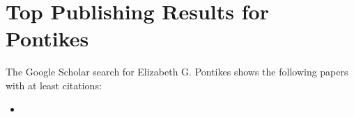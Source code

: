 \section{Top Publishing Results for Pontikes}

The Google Scholar search for Elizabeth G. Pontikes shows the following papers with at least  citations:\\

\begin{itemize}
\item 
\end{itemize}
